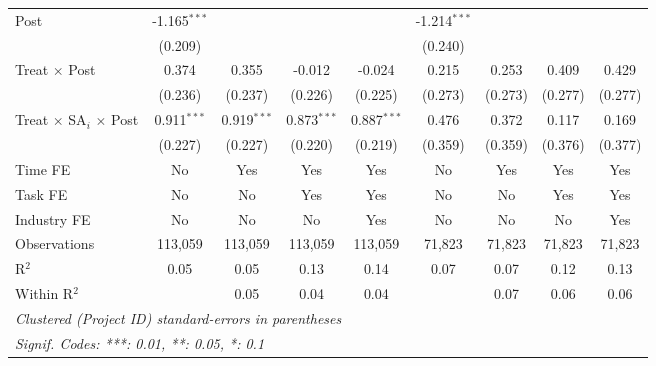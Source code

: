 \documentclass[
]{article}
\begin{document}
\begin{tabular}{lcccccccc}
   Post                                  & -1.165$^{***}$ &                &               &               & -1.214$^{***}$ &                &                &   \\   
                                         & (0.209)        &                &               &               & (0.240)        &                &                &   \\   
   Treat $\times$ Post                   & 0.374          & 0.355          & -0.012        & -0.024        & 0.215          & 0.253          & 0.409          & 0.429\\   
                                         & (0.236)        & (0.237)        & (0.226)       & (0.225)       & (0.273)        & (0.273)        & (0.277)        & (0.277)\\   
   Treat $\times$ SA$_i$ $\times$ Post   & 0.911$^{***}$  & 0.919$^{***}$  & 0.873$^{***}$ & 0.887$^{***}$ & 0.476          & 0.372          & 0.117          & 0.169\\   
                                         & (0.227)        & (0.227)        & (0.220)       & (0.219)       & (0.359)        & (0.359)        & (0.376)        & (0.377)\\   
   Time FE                               & No             & Yes            & Yes           & Yes           & No             & Yes            & Yes            & Yes\\  
   Task FE                               & No             & No             & Yes           & Yes           & No             & No             & Yes            & Yes\\  
   Industry FE                           & No             & No             & No            & Yes           & No             & No             & No             & Yes\\  
   Observations                          & 113,059        & 113,059        & 113,059       & 113,059       & 71,823         & 71,823         & 71,823         & 71,823\\  
   R$^2$                                 & 0.05           & 0.05           & 0.13          & 0.14          & 0.07           & 0.07           & 0.12           & 0.13\\  
   Within R$^2$                          &                & 0.05           & 0.04          & 0.04          &                & 0.07           & 0.06           & 0.06\\  
   \midrule
   \multicolumn{9}{l}{\emph{Clustered (Project ID) standard-errors in parentheses}}\\
   \multicolumn{9}{l}{\emph{Signif. Codes: ***: 0.01, **: 0.05, *: 0.1}}\\
\end{tabular}
\par\endgroup
\end{document}
